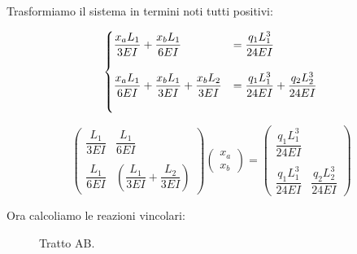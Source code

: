 \documentclass[a4paper,12pt, oneside]{book}
\begin{document}
	Trasformiamo il sistema in termini noti tutti positivi:
	
	\begin{equation}
		\centering
		\begin{cases}
			\dfrac{x_a L_1}{3EI}+\dfrac{x_b L_1}{6EI}&=\dfrac{q_1 L_1^{3}}{24EI} \\ \\
			\dfrac{x_a L_1}{6EI}+\dfrac{x_b L_1}{3EI}+\dfrac{x_b L_2}{3EI}&=\dfrac{q_1 L_1^{3}}{24EI}+\dfrac{q_2 L_2^{3}}{24EI}\\ \\ 
		\end{cases}
		\hfill
	\end{equation}
	
	\begin{equation}
		\begin{pmatrix}
			\dfrac{L_1}{3EI} & \dfrac{L_1}{6EI}\\\\ \dfrac{L_1}{6EI} & (\dfrac{L_1}{3EI}+\dfrac{L_2}{3EI})
		\end{pmatrix}
		\begin{pmatrix}
			x_a \\ x_b
		\end{pmatrix}
		=
		\begin{pmatrix}
			\dfrac{q_1 L_1^{3}}{24EI} \\\\ \dfrac{q_1 L_1^{3}}{24EI} & \dfrac{q_2 L_2^{3}}{24EI}
		\end{pmatrix}
	\end{equation}	
	
	\phantom{text}
	
	\phantom{text}
	
	Ora calcoliamo le reazioni vincolari:
	
	\begin{figure}[H]
		\centering
		\caption{Tratto AB.}
		\label{fig:ddfdfvcfvbccvsdsaazx}
	\end{figure}
	
\end{document}
